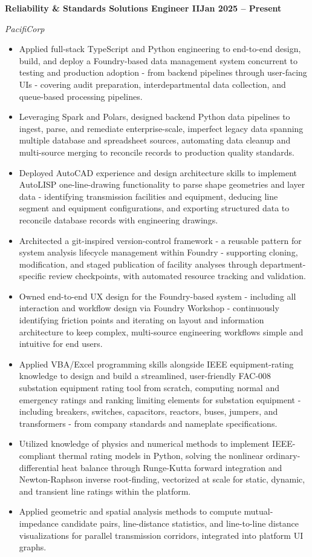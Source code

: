 \documentclass[10pt, letterpaper]{article}
\newcommand{\jobline}[2]{%
  \vspace{5pt}%
  \noindent\textbf{#1}\hfill\textbf{#2}\par%
  \vspace{1pt}%
}
\newcommand{\subline}[1]{%
  \vspace{-1pt}%
  \noindent\textit{#1}\par%
  \vspace{1pt}%
}
\newenvironment{rlist}{%
  \begin{itemize}[leftmargin=1.4em, itemsep=1pt, topsep=2pt, parsep=0pt]%
}{%
  \end{itemize}%
}
\begin{document}
\jobline{Reliability \& Standards Solutions Engineer II}{Jan 2025 -- Present}
\subline{PacifiCorp}
\begin{rlist}
  \item Applied full-stack TypeScript and Python engineering to end-to-end design, build, and deploy a Foundry-based data management system concurrent to testing and production adoption - from backend pipelines through user-facing UIs - covering audit preparation, interdepartmental data collection, and queue-based processing pipelines.
  \item Leveraging Spark and Polars, designed backend Python data pipelines to ingest, parse, and remediate enterprise-scale, imperfect legacy data spanning multiple database and spreadsheet sources, automating data cleanup and multi-source merging to reconcile records to production quality standards.
  \item Deployed AutoCAD experience and design architecture skills to implement AutoLISP one-line-drawing functionality to parse shape geometries and layer data - identifying transmission facilities and equipment, deducing line segment and equipment configurations, and exporting structured data to reconcile database records with engineering drawings.
  \item Architected a git-inspired version-control framework - a reusable pattern for system analysis lifecycle management within Foundry - supporting cloning, modification, and staged publication of facility analyses through department-specific review checkpoints, with automated resource tracking and validation.
  \item Owned end-to-end UX design for the Foundry-based system - including all interaction and workflow design via Foundry Workshop - continuously identifying friction points and iterating on layout and information architecture to keep complex, multi-source engineering workflows simple and intuitive for end users.
  \item Applied VBA/Excel programming skills alongside IEEE equipment-rating knowledge to design and build a streamlined, user-friendly FAC-008 substation equipment rating tool from scratch, computing normal and emergency ratings and ranking limiting elements for substation equipment - including breakers, switches, capacitors, reactors, buses, jumpers, and transformers - from company standards and nameplate specifications.
  \item Utilized knowledge of physics and numerical methods to implement IEEE-compliant thermal rating models in Python, solving the nonlinear ordinary-differential heat balance through Runge-Kutta forward integration and Newton-Raphson inverse root-finding, vectorized at scale for static, dynamic, and transient line ratings within the platform.
  \item Applied geometric and spatial analysis methods to compute mutual-impedance candidate pairs, line-distance statistics, and line-to-line distance visualizations for parallel transmission corridors, integrated into platform UI graphs.
\end{rlist}
\end{document}
